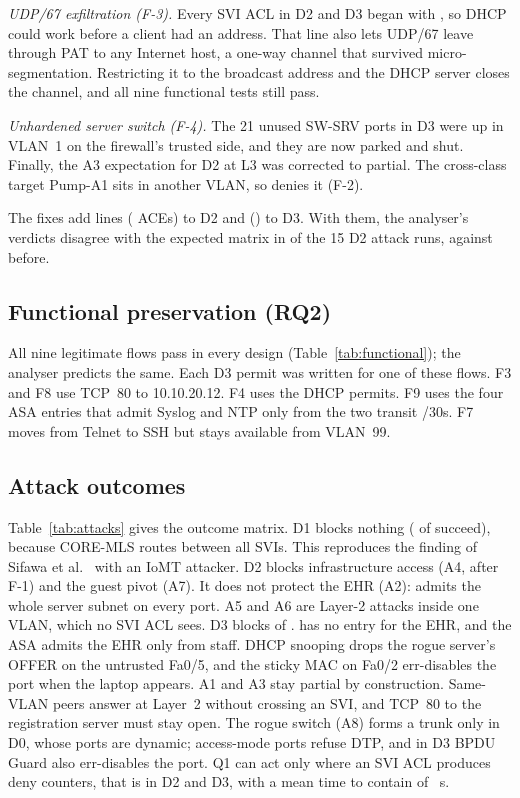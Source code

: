 \emph{UDP/67 exfiltration (F-3).} Every SVI ACL in D2 and D3 began with , so DHCP could work before a client had an address. That line also lets UDP/67 leave through PAT to any Internet host, a one-way channel that survived micro-segmentation. Restricting it to the broadcast address and the DHCP server closes the channel, and all nine functional tests still pass.

\emph{Unhardened server switch (F-4).} The 21 unused SW-SRV ports in D3 were up in VLAN~1 on the firewall's trusted side, and they are now parked and shut. Finally, the A3 expectation for D2 at L3 was corrected to partial. The cross-class target Pump-A1 sits in another VLAN, so  denies it (F-2).

The fixes add \fixDeltaDtwo{} lines (\fixDeltaAcesDtwo{} ACEs) to D2 and \fixDeltaDthree{} (\fixDeltaAcesDthree{}) to D3. With them, the analyser's verdicts disagree with the expected matrix in \fixDisDtwoPost{} of the 15 D2 attack runs, against \fixDisDtwoPre{} before.
\fi



\subsection{Functional preservation (RQ2)}
All nine legitimate flows pass in every design (Table~\ref{tab:functional})\expnote; the analyser predicts the same. Each D3 permit was written for one of these flows. F3 and F8 use TCP~80 to 10.10.20.12. F4 uses the DHCP permits. F9 uses the four ASA entries that admit Syslog and NTP only from the two transit /30s. F7 moves from Telnet to SSH but stays available from VLAN~99.



\subsection{Attack outcomes}
Table~\ref{tab:attacks} gives the outcome matrix\expnote. D1 blocks nothing (\succeededDone{} of \nAttacks{} succeed), because CORE-MLS routes between all SVIs. This reproduces the finding of Sifawa et al.~\cite{Sifawa2026ImplementationEvaluation} with an IoMT attacker. D2 blocks infrastructure access (A4, after F-1) and the guest pivot (A7). It does not protect the EHR (A2):  admits the whole server subnet on every port. A5 and A6 are Layer-2 attacks inside one VLAN, which no SVI ACL sees. D3 blocks \blockedDthree{} of \nAttacks{}.  has no entry for the EHR, and the ASA admits the EHR only from staff. DHCP snooping drops the rogue server's OFFER on the untrusted Fa0/5, and the sticky MAC on Fa0/2 err-disables the port when the laptop appears. A1 and A3 stay partial by construction. Same-VLAN peers answer at Layer~2 without crossing an SVI, and TCP~80 to the registration server must stay open. The rogue switch (A8) forms a trunk only in D0, whose ports are dynamic; access-mode ports refuse DTP, and in D3 BPDU Guard also err-disables the port. Q1 can act only where an SVI ACL produces deny counters, that is in D2 and D3\ifhaveqone, with a mean time to contain of \qOneContain~s\fi.

